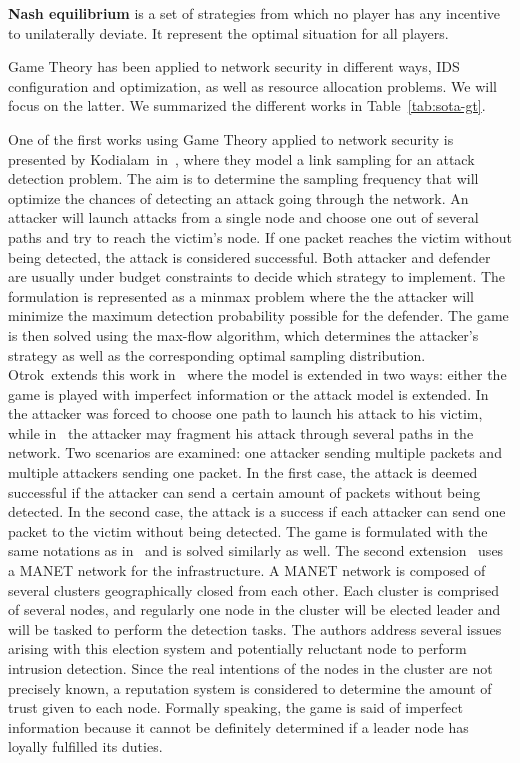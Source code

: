 \textbf{Nash equilibrium} is a set of strategies from which no player has any incentive to unilaterally deviate. It represent the optimal situation for all players.

Game Theory has been applied to network security in different ways, IDS configuration and optimization, as well as resource allocation problems. We will focus on the latter. We summarized the different works in Table~\ref{tab:sota-gt}.

 One of the first works using Game Theory applied to network security is presented by Kodialam~\etal in~\cite{MuraliKodialam2003}, where they model a link sampling for an attack detection problem.
 The aim is to determine the sampling frequency that will optimize the chances of detecting an attack going through the network.
 An attacker will launch attacks from a single node and choose one out of several paths and try to reach the victim's node.
 If one packet reaches the victim without being detected, the attack is considered successful.
 Both attacker and defender are usually under budget constraints to decide which strategy to implement.
 The formulation is represented as a minmax problem where the the attacker will minimize the maximum detection probability possible for the defender.
 The game is then solved using the max-flow algorithm, which determines the attacker's strategy as well as the corresponding optimal sampling distribution.
 Otrok~\etal extends this work in~\cite{otrok1,otrok2} where the model is extended in two ways: either the game is played with imperfect information or the attack model is extended.
 In~\cite{MuraliKodialam2003} the attacker was forced to choose one path to launch his attack to his victim, while in~\cite{otrok1} the attacker may fragment his attack through several paths in the network.
 Two scenarios are examined: one attacker sending multiple packets and multiple attackers sending one packet.
 In the first case, the attack is deemed successful if the attacker can send a certain amount of packets without being detected.
 In the second case, the attack is a success if each attacker can send one packet to the victim without being detected.
 The game is formulated with the same notations as in~\cite{MuraliKodialam2003} and is solved similarly as well.
 The second extension~\cite{otrok2} uses a MANET network for the infrastructure.
 A MANET network is composed of several clusters geographically closed from each other.
 Each cluster is comprised of several nodes, and regularly one node in the cluster will be elected leader and will be tasked to perform the detection tasks. The authors address several issues arising with this election system and potentially reluctant node to perform intrusion detection.
 Since the real intentions of the nodes in the cluster are not precisely known, a reputation system is considered to determine the amount of trust given to each node.
 Formally speaking, the game is said of imperfect information because it cannot be definitely determined if a leader node has loyally fulfilled its duties.
 
